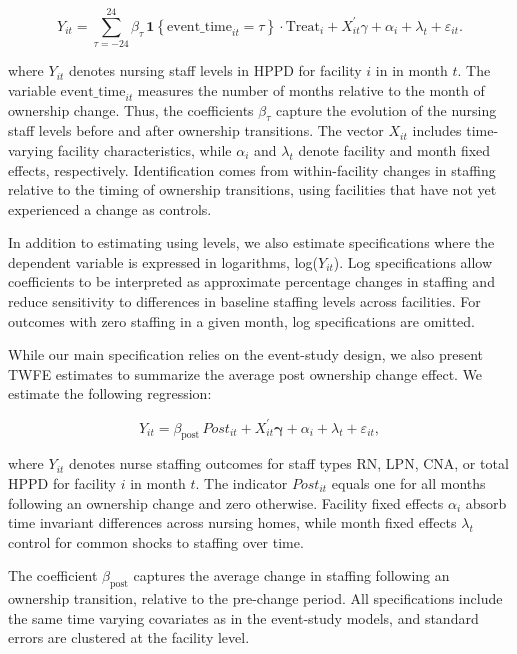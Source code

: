 \documentclass[preprint,authoryear]{elsarticle}
\begin{document}
\begin{equation}
\label{eq:es_twfe}
Y_{it}
=
\sum_{\tau = -24}^{24}
    \beta_{\tau}\,
    \mathbf{1}\!\left\{ \text{event\_time}_{it} = \tau \right\}
    \cdot \text{Treat}_{i}
+
X_{it}^{\prime}\gamma
+
\alpha_i
+
\lambda_t
+
\varepsilon_{it}.
\end{equation}

where $Y_{it}$ denotes nursing staff levels in HPPD for facility $i$ in in month $t$. The variable $\text{event\_time}_{it}$ measures the number of months relative to the month of ownership change. Thus, the coefficients $\beta_{\tau}$ capture the evolution of the nursing staff levels before and after ownership transitions. The vector $X_{it}$ includes time-varying facility characteristics, while $\alpha_i$ and $\lambda_t$ denote facility and month fixed effects, respectively. Identification comes from within-facility changes in staffing relative to the timing of ownership transitions, using facilities that have not yet experienced a change as controls.

In addition to estimating using levels, we also estimate specifications where the dependent variable is expressed in logarithms, log($Y_{it}$). Log specifications allow coefficients to be interpreted as approximate percentage changes in staffing and reduce sensitivity to differences in baseline staffing levels across facilities. For outcomes with zero staffing in a given month, log specifications are omitted.

While our main specification relies on the event-study design, we also present TWFE estimates to summarize the average post ownership change effect. We estimate the following regression:

\begin{equation}
  Y_{it}
  =
  \beta_{\text{post}}\,\textit{Post}_{it}
  +
  X_{it}^{\prime}\boldsymbol{\gamma}
  +
  \alpha_i
  +
  \lambda_t
  +
  \varepsilon_{it},
  \label{eq:twfe-post}
\end{equation}

where $Y_{it}$ denotes nurse staffing outcomes for staff types RN, LPN, CNA, or total HPPD for facility $i$ in month $t$. The indicator $\textit{Post}_{it}$ equals one for all months following an ownership change and zero otherwise. Facility fixed effects $\alpha_i$ absorb time invariant differences across nursing homes, while month fixed effects $\lambda_t$ control for common shocks to staffing over time.

The coefficient $\beta_{\text{post}}$ captures the average change in staffing following an ownership transition, relative to the pre-change period. All specifications include the same time varying covariates as in the event-study models, and standard errors are clustered at the facility level.
\end{document}
